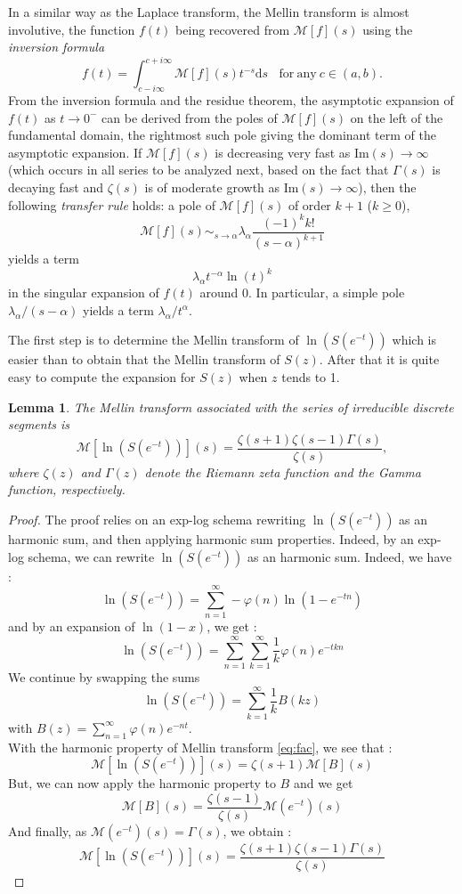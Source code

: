 \documentclass{article}
\def\cM{\mathcal{M}}
\newtheorem{lemma}[theorem]{Lemma}
\begin{document}
In a similar way as the Laplace transform, the Mellin transform is almost involutive,
the function $f(t)$ being recovered from $\cM[f](s)$ using the
\emph{inversion formula}
\begin{equation}\label{eq:inverse_mellin}
f(t)=\int_{c-i\infty}^{c+i\infty}\cM[f](s)t^{-s}\mathrm{d}s\ \ \ \ \mathrm{for\ any\ }c\in(a,b).
\end{equation}
From the inversion formula and the residue theorem, the asymptotic expansion of $f(t)$ as $t\to 0^-$
can be derived from the poles of $\cM[f](s)$ on the left of the fundamental
domain, the rightmost such pole giving the dominant term of the asymptotic
expansion. If $\cM[f](s)$ is decreasing very fast as
$\mathrm{Im}(s)\to\infty$
 (which occurs in all series to be analyzed next, based on the
fact that $\Gamma (s)$ is decaying fast and $\zeta(s)$ is of
moderate growth as $\mathrm{Im}(s)\to\infty$), then the
following \emph{transfer rule} holds: a pole of $\cM[f](s)$ of
order $k\!+\!1$ ($k\geq 0$),
$$
\cM[f](s)\mathop{\sim}_{s\to\alpha}\lambda_{\alpha}\frac{(-1)^kk!}{(s-\alpha)^{k+1}}
$$
yields a term
$$\lambda_{\alpha}t^{-\alpha}\ln(t)^k$$
in the singular expansion of $f(t)$ around $0$.
In particular, a simple pole $\lambda_{\alpha}/(s-\alpha)$ yields
a term $\lambda_{\alpha}/t^{\alpha}$.

The first step is to determine the Mellin transform of
$\ln(S(e^{-t}))$ which is easier than to obtain that the
Mellin transform of $S(z)$. After that it is quite easy to compute the expansion for $S(z)$ when $z$ tends to 1.
\begin{lemma}
\label{pouranne}
The Mellin transform associated with the
series of irreducible discrete segments is
  $$\cM[\ln(S(e^{-t}))](s)={\frac {\zeta  \left( s+1 \right) \zeta  \left( s-1 \right) \Gamma
 \left( s \right) }{\zeta  \left( s \right) }},$$
 where $\zeta(z)$ and $\Gamma(z)$ denote the Riemann zeta function and the Gamma function, respectively.
 \end{lemma}
 \begin{proof} 
 The proof relies on an exp-log schema rewriting $\ln(S(e^{-t}))$ as an harmonic sum, and then applying harmonic sum properties.
Indeed, by an exp-log schema, we can rewrite $\ln(S(e^{-t}))$ as an harmonic sum. Indeed, we have :
 $$ \ln(S(e^{-t})) = \sum\limits_{n=1}^\infty -\varphi(n)\ln(1-e^{-tn}) $$
 and by an expansion of $\ln(1-x)$, we get :
  $$ \ln(S(e^{-t})) = \sum\limits_{n=1}^\infty \sum\limits_{k=1}^\infty\frac1{k}\varphi(n)e^{-tkn} $$
  We continue by swapping the sums
 $$ \ln(S(e^{-t})) = \sum\limits_{k=1}^\infty \frac1{k}B(kz)$$ with $B(z)=\sum\limits_{n=1}^\infty \varphi(n)e^{-nt}.$\\
 With the harmonic property of Mellin transform \ref{eq:fac}, we see that :
 $$ \cM[\ln(S(e^{-t}))](s) = \zeta(s+1)\cM[B](s)$$
 But, we can now apply the harmonic property to $B$ and we get $$\cM[B](s)=\dfrac{\zeta(s-1)}{\zeta(s)}\cM(e^{-t})(s)$$
And finally, as $\cM(e^{-t})(s)=\Gamma(s)$, we obtain :
  $$\cM[\ln(S(e^{-t}))](s)={\frac {\zeta  \left( s+1 \right) \zeta  \left( s-1 \right) \Gamma
 \left( s \right) }{\zeta  \left( s \right) }}$$

   \end{proof}
\end{document}
